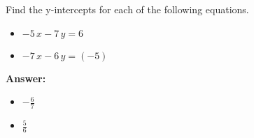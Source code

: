 Find the y-intercepts for each of the following equations. \begin{itemize}\item \( -5 \, x - 7 \, y = 6 \)\item \( -7 \, x - 6 \, y = \left(-5\right) \)\end{itemize}

        \textbf{Answer:} \begin{itemize}\item \( -\frac{6}{7} \)\item \( \frac{5}{6} \)\end{itemize}
